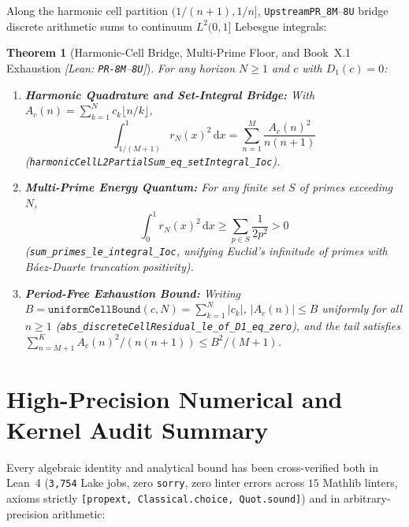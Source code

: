 \documentclass[11pt,a4paper]{article}
\newtheorem{theorem}{Theorem}[section]
\theoremstyle{definition}
\begin{document}
Along the harmonic cell partition $(1/(n+1), 1/n]$, \texttt{UpstreamPR\_8M}--\texttt{8U} bridge discrete arithmetic sums to continuum $L^2(0,1]$ Lebesgue integrals:

\begin{theorem}[Harmonic-Cell Bridge, Multi-Prime Floor, and Book~X.1 Exhaustion \emph{[Lean: \texttt{PR-8M}--\texttt{8U}]}]
For any horizon $N \ge 1$ and $c$ with $D_1(c) = 0$:
\begin{enumerate}[leftmargin=1.6em]
  \item \textbf{Harmonic Quadrature and Set-Integral Bridge:} With $A_c(n) = \sum_{k=1}^N c_k \lfloor n/k \rfloor$,
  \[
    \int_{1/(M+1)}^1 r_N(x)^2\,\mathrm{d}x = \sum_{n=1}^M \frac{A_c(n)^2}{n(n+1)}
  \]
  (\texttt{harmonicCellL2PartialSum\_eq\_setIntegral\_Ioc}).
  \item \textbf{Multi-Prime Energy Quantum:} For any finite set $S$ of primes exceeding $N$,
  \[
    \int_0^1 r_N(x)^2\,\mathrm{d}x \ge \sum_{p \in S} \frac{1}{2p^2} > 0
  \]
  (\texttt{sum\_primes\_le\_integral\_Ioc}, unifying Euclid's infinitude of primes with B\'aez-Duarte truncation positivity).
  \item \textbf{Period-Free Exhaustion Bound:} Writing $B = \texttt{uniformCellBound}(c, N) = \sum_{k=1}^N |c_k|$, $|A_c(n)| \le B$ uniformly for all $n \ge 1$ (\texttt{abs\_discreteCellResidual\_le\_of\_D1\_eq\_zero}), and the tail satisfies $\sum_{n=M+1}^K A_c(n)^2/(n(n+1)) \le B^2/(M+1)$.
\end{enumerate}
\end{theorem}

\section{High-Precision Numerical and Kernel Audit Summary}

Every algebraic identity and analytical bound has been cross-verified both in Lean~4 (\texttt{3,754} Lake jobs, zero \texttt{sorry}, zero linter errors across $15$ Mathlib linters, axioms strictly \texttt{[propext, Classical.choice, Quot.sound]}) and in arbitrary-precision arithmetic:
\end{document}
